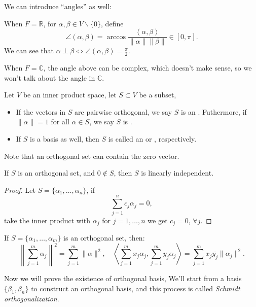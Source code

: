 We can introduce ``angles'' as well:
\begin{definition}[Angles]
	When $F = \mathbb{R}$, for $\alpha, \beta\in V \backslash\{0\}$,
	define
	\[
	\angle (\alpha,\beta) = \arccos
	\frac{\left<\alpha, \beta\right>}{\lVert \alpha \rVert \lVert \beta \rVert}
	\in [0,\pi].
	\]
	We can see that $\alpha\perp \beta \iff \angle (\alpha,\beta) = \frac{\pi}{2}$.
\end{definition}
When $F = \mathbb{C}$, the angle above can be complex, which doesn't make
sense, so we won't talk about the angle in $\mathbb{C}$.

\begin{definition}
	Let $V$ be an inner product space, let $S \subset V$ be a subset,
	\begin{itemize}
		\item If the vectors in $S$ are pairwise orthogonal,
			we say $S$ is an .
			Futhermore, if $ \lVert \alpha \rVert = 1$ for all $\alpha\in S$,
			we say $S$ is .
		\item If $S$ is a basis as well, then $S$ is called an
			 or , respectively.
	\end{itemize}
	Note that an orthogonal set can contain the zero vector.
\end{definition}

\begin{proposition}
	If $S$ is an orthogonal set, and $0\notin S$, then $S$ is linearly independent.
\end{proposition}
\begin{proof}[Proof]
    Let $S = \{\alpha_1,\dots,\alpha_n\}$, if
	\[
	\sum_{j=1}^{n} c_j\alpha_j = 0,
	\]
	take the inner product with $\alpha_j$ for $j=1,\dots,n$
	we get $c_j=0$, $\forall j$.
\end{proof}

\begin{proposition}
	If $S = \{\alpha_1,\dots,\alpha_m\}$ is an orthogonal set, then:
	\[
		\left\lVert \sum_{j=1}^{m} \alpha_j\right\rVert^2 =
		\sum_{j=1}^{m} \lVert \alpha \rVert^2,\quad
		\left<\sum_{j=1}^{m} x_j\alpha_j, \sum_{j=1}^{m} y_j\alpha_j \right> =
		\sum_{j=1}^{m} x_j \overline{y_j} \lVert \alpha_j \rVert ^2.
	\]
\end{proposition}

Now we will prove the existence of orthogonal basis,
We'll start from a basis $\{\beta_1,\beta_n\}$ to construct an orthogonal basis,
and this process is called \textit{Schmidt orthogonalization}.

